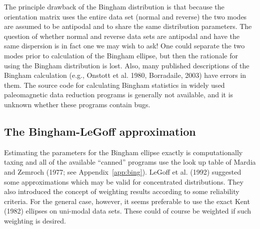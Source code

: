  The principle drawback of the Bingham distribution is that because the orientation matrix uses the entire data set (normal and reverse) the two modes are assumed to be antipodal and to share the same distribution parameters.  The question of whether normal and reverse data sets are antipodal and have the same dispersion is in fact one we may wish to ask!    One could separate the two modes prior to calculation of the 
 Bingham ellipse, but then the rationale for using the Bingham distribution is lost.  Also, many published descriptions of the Bingham calculation (e.g.,
Onstott et al. 1980, Borradaile,  2003)  \nocite{onstott80,borradaile03}  have errors in them.   The source code for calculating Bingham statistics in widely used  paleomagnetic data reduction programs  is generally not available, and it is unknown whether these programs contain bugs.   
 
 \subsection{The Bingham-LeGoff approximation}
 
 Estimating the parameters for the Bingham ellipse exactly is computationally taxing and all of the available ``canned'' programs use the look up table of 
 Mardia and Zemroch (1977;  see Appendix~\ref{app:bing}).  \nocite{mardia77}
  LeGoff et al. (1992) \nocite{legoff92} suggested some approximations which may be valid for concentrated distributions.   They also introduced the concept of weighting results according to  some reliability criteria.   For the general case, however, it seems preferable to use the exact
   Kent (1982) \nocite{kent82}
  ellipses on uni-modal data sets.  These could of course be weighted if such weighting is desired.  
 
